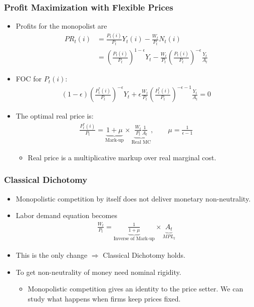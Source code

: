 \documentclass[english,xcolor=svgnames]{beamer}
\begin{document}
\begin{frame}
\frametitle{Profit Maximization with Flexible Prices}
\begin{itemize}
	\item Profits for the monopolist are
	\begin{align*}
		PR_t(i)&=\frac{P_t(i)}{P_t}Y_t(i) - \frac{W_t}{P_t}N_t(i)  \\
		&= \left(\frac{P_t(i)}{ P_t}\right)^{1-\epsilon}Y_t -\frac{W_t}{P_t}  \left(\frac{P_t(i)}{ P_t}\right)^{-\epsilon}  \frac{Y_t}{A_t}
	\end{align*}
	\item FOC for $P_t(i)$:
	\begin{align*}
		(1-\epsilon)\left(\frac{P_t^*(i)}{ P_t}\right)^{-\epsilon}Y_t + \epsilon\frac{W_t}{P_t}  \left(\frac{P_t^*(i)}{ P_t}\right)^{-\epsilon-1}  \frac{Y_t}{A_t} = 0
	\end{align*}
	\item The optimal real price is:
	\begin{align*}
		\frac{P_t^*(i)}{ P_t} = \underbrace{1+\mu}_{\text{Mark-up}} \times \underbrace{\frac{W_t}{P_t}\frac{1}{A_t}}_{\text{Real MC}},\qquad \mu = \frac{1}{\epsilon-1}
	\end{align*}
	\begin{itemize}
		\item Real price is a multiplicative markup over real marginal cost.
	\end{itemize}
\end{itemize}
\end{frame}

\begin{frame}
\frametitle{Classical Dichotomy}
\begin{itemize}
	\item Monopolistic competition by itself does not deliver monetary non-neutrality.
	\item Labor demand equation becomes
	\begin{align*}
		 \frac{W_t}{P_t} = \underbrace{\frac{1}{1+\mu}}_{\text{Inverse of Mark-up}} \times \underbrace{A_t}_{MPL_t}
	\end{align*}
	\item This is the only change $\Rightarrow$ Classical Dichotomy holds.
	\item To get non-neutrality of money need nominal rigidity.
	\begin{itemize}
		\item Monopolistic competition gives an identity to the price setter. We can study what happens when firms keep prices fixed.
	\end{itemize}
\end{itemize}
\end{frame}
\end{document}
